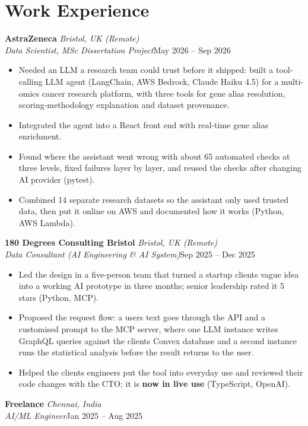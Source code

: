 \documentclass[a4paper,11pt]{article}
\newcommand{\role}[4]{%
  \textbf{#1}{\color{muted}\,\textperiodcentered\,\textit{#2}}\\
  \textit{#4}\hfill{\color{muted}#3}\par}
\newcommand{\gap}{\vspace{5pt}}
\newcommand{\num}[1]{\textbf{#1}}   %
\begin{document}
\section{Work Experience}
\role{AstraZeneca}{Bristol, UK (Remote)}{May 2026 – Sep 2026}{Data Scientist, MSc Dissertation Project}
\begin{itemize}
  \item Needed an LLM a research team could trust before it shipped: built a tool-calling LLM agent (LangChain, AWS Bedrock, Claude Haiku 4.5) for a multi-omics cancer research platform, with three tools for gene alias resolution, scoring-methodology explanation and dataset provenance.
  \item Integrated the agent into a React front end with real-time gene alias enrichment.
  \item Found where the assistant went wrong with about 65 automated checks at three levels, fixed failures layer by layer, and reused the checks after changing AI provider (pytest).
  \item Combined 14 separate research datasets so the assistant only used trusted data, then put it online on AWS and documented how it works (Python, AWS Lambda).
\end{itemize}
\gap
{}
\role{180 Degrees Consulting Bristol}{Bristol, UK (Remote)}{Sep 2025 – Dec 2025}{Data Consultant (AI Engineering \& AI System)}
\begin{itemize}
  \item Led the design in a five-person team that turned a startup client\textquotesingle{}s vague idea into a working AI prototype in three months; senior leadership rated it 5 stars (Python, MCP).
  \item Proposed the request flow: a user\textquotesingle{}s text goes through the API and a customised prompt to the MCP server, where one LLM instance writes GraphQL queries against the client\textquotesingle{}s Convex database and a second instance runs the statistical analysis before the result returns to the user.
  \item Helped the client\textquotesingle{}s engineers put the tool into everyday use and reviewed their code changes with the CTO; it is \num{now in live use} (TypeScript, OpenAI).
\end{itemize}
\gap
{}
\role{Freelance}{Chennai, India}{Jan 2025 – Aug 2025}{AI/ML Engineer}
\end{document}
